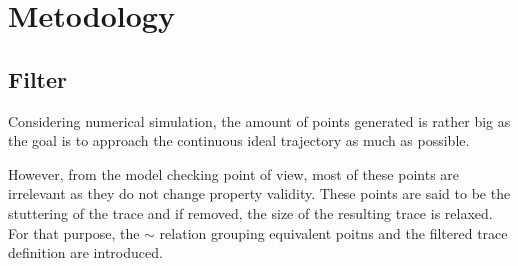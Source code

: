 \documentclass[12pt,oneside,draft]{fithesis}
\begin{document}
\chapter{Metodology}
\section{Filter}
Considering numerical simulation, the amount of points
generated is rather big as the goal is to approach the continuous ideal
trajectory as much as possible.

However, from the model checking point of view, most of these points
are irrelevant as they do not change
property validity. These points are said to be the stuttering of the
trace\cite{lamport} and if removed, the size of the resulting trace
is relaxed. For that purpose, the $\sim$ relation grouping equivalent
poitns and the filtered trace definition are introduced.
\end{document}
